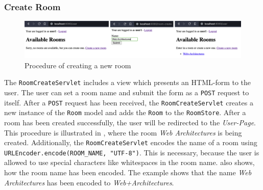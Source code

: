 \subsubsection{Create Room}\label{subsubsec:03_impl_servlets_createroom}
\begin{figure}[h]
\centering
\includegraphics[scale=0.15]{images/03_impl/create-room/create-room}
\caption{Procedure of creating a new room}
\label{fig:03_impl_servlets_createroom_create}
\end{figure}
The \texttt{RoomCreateServlet} includes a view which presents an HTML-form to the user. The user can set a room name and submit the form as a \texttt{POST} request to itself.
After a \texttt{POST} request has been received, the \texttt{RoomCreateServlet} creates a new instance of the \texttt{Room} model and adds the \texttt{Room} to the \texttt{RoomStore}. After a room has been created successfully, the user will be redirected to the \textit{User-Page}. This procedure is illustrated in , where the room \textit{Web Architectures} is being created.
Additionally, the \texttt{RoomCreateServlet} encodes the name of a room using \texttt{URLEncoder.encode(ROOM\_NAME, "UTF-8")}. This is necessary, because the user is allowed to use special characters like whitespaces in the room name.  also shows, how the room name has been encoded. The example shows that the name \textit{Web Architectures} has been encoded to \textit{Web+Architectures}.


\newpage
